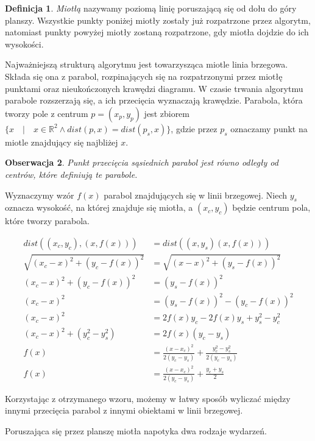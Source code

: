 \documentclass[declaration,shortabstract, inz]{iithesis}
\theoremstyle{definition} \newtheorem{definition}{Definicja}[]
\theoremstyle{plain} \newtheorem{remark}[definition]{Obserwacja}
\theoremstyle{plain} \newtheorem{theorem}[definition]{Twierdzenie}
\theoremstyle{plain} \newtheorem{example}{Przykład}[definition]
\theoremstyle{plain} \newtheorem{lemma}[definition]{Lemat}
\begin{document}
\begin{definition}
\textit{Miotłą} nazywamy poziomą linię poruszającą się od dołu do góry planszy. Wszystkie punkty poniżej miotły zostały już rozpatrzone przez algorytm, natomiast punkty powyżej miotły zostaną rozpatrzone, gdy miotła dojdzie do ich wysokości.
\end{definition}

Najważniejszą strukturą algorytmu jest towarzysząca miotle linia brzegowa. Składa się ona z parabol, rozpinających się na rozpatrzonymi przez miotłę punktami oraz nieukończonych krawędzi diagramu. W czasie trwania algorytmu parabole rozszerzają się, a ich przecięcia wyznaczają krawędzie. Parabola, która tworzy pole z centrum $p = (x_p, y_p)$ jest zbiorem $\{ x \quad | \quad x \in \mathbb{R}^2 \land dist(p, x) = dist(p_s, x) \}$, gdzie przez $p_s$ oznaczamy punkt na miotle znajdujący się najbliżej $x$. 

\begin{remark}
Punkt przecięcia sąsiednich parabol jest równo odległy od centrów, które definiują te parabole.
\end{remark}

Wyznaczymy wzór $f(x)$ parabol znajdujących się w linii brzegowej.
Niech $y_s$ oznacza wysokość, na której znajduje się miotła, a $(x_c, y_c)$ będzie centrum pola, które tworzy parabola. 

\begin{align*}
	dist((x_c, y_c), (x, f(x))) &= dist((x, y_s) (x, f(x))) \\
	\sqrt{(x_c - x)^2 + (y_c - f(x))^2} &= \sqrt{(x - x)^2 + (y_s - f(x))^2} \\
	(x_c - x)^2 + (y_c - f(x))^2 &= (y_s - f(x))^2 \\
	(x_c - x)^2 &= (y_s - f(x))^2 - (y_c - f(x))^2 \\ 
	(x_c - x)^2 &= 2f(x)y_c - 2f(x)y_s + y_s^2 - y_c^2 \\
	(x_c - x)^2 + (y_c^2 - y_s^2) &= 2f(x)(y_c - y_s) \\
	f(x) &= \frac{(x - x_c)^2}{2(y_c - y_s)} + \frac{y_c^2 - y_s^2}{2(y_c - y_s)} \\
	f(x) &= \frac{(x - x_c)^2}{2(y_c - y_s)} + \frac{y_c + y_s}{2}
\end{align*}

Korzystając z otrzymanego wzoru, możemy w łatwy sposób wyliczać między innymi przecięcia parabol z innymi obiektami w linii brzegowej.

Poruszająca się przez planszę miotła napotyka dwa rodzaje wydarzeń.
\end{document}
